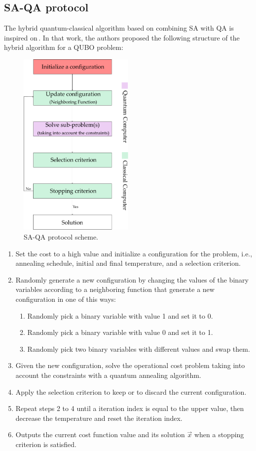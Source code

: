 \subsection{SA-QA protocol}
The hybrid quantum-classical algorithm based on combining SA with QA is inspired on\,\cite{Ding2019ImplementationDesign}. In that work, the authors proposed the following structure of the hybrid algorithm for a QUBO problem:
\begin{figure}[H]
\centering
\includegraphics[width=0.5\textwidth]{Figures/SAQAProtocol_Layer 1.pdf} 
\caption{SA-QA protocol scheme.}
\label{fig:SA_QAProtocol}
\end{figure}
\begin{enumerate}
    \item Set the cost to a high value and initialize a configuration for the problem, i.e., annealing schedule, initial and final temperature, and a selection criterion.
    \item Randomly generate a new configuration by changing the values of the binary variables according to a neighboring function that generate a new configuration in one of this ways:
    \begin{enumerate}
        \item Randomly pick a binary variable with value 1 and set it to 0.
        \item Randomly pick a binary variable with value 0 and set it to 1.
        \item Randomly pick two binary variables with different values and swap them.
    \end{enumerate}
    \item Given the new configuration, solve the operational cost problem taking into account the constraints with a quantum annealing algorithm.
    \item Apply the selection criterion to keep or to discard the current configuration.
    \item Repeat steps 2 to 4 until a iteration index is equal to the upper value, then decrease the temperature and reset the iteration index.
    \item Outputs the current cost function value and its solution $\vec{x}$ when a stopping criterion is satisfied.
\end{enumerate}
